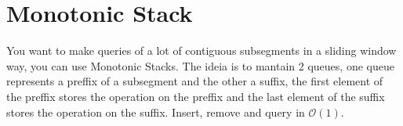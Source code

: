 \section{Monotonic Stack}

You want to make queries of a lot of contiguous subsegments in a sliding window way, you can use Monotonic Stacks. The ideia is to mantain 2 queues, one queue represents a preffix of a subsegment and the other a suffix, the first element of the preffix stores the operation on the preffix and the last element of the suffix stores the operation on the suffix. Insert, remove and query in $\mathcal{O}(1)$.

